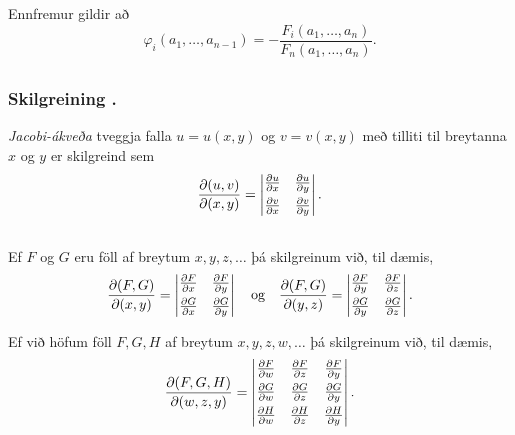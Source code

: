 Ennfremur gildir að 
$$\varphi_i(a_1,\ldots,a_{n-1})
=-\frac{F_i(a_1,\ldots,a_n)}{F_n(a_1,\ldots,a_n)}.$$ 






\subsection{} 

\subsubsection{Skilgreining \kaflanr.}
  
{\em Jacobi-ákveða} tveggja falla $u=u(x,y)$ og $v=v(x,y)$ með
tilliti til breytanna $x$ og $y$ er skilgreind sem 
$$\frac{\partial(u,v)}{\partial(x,y)}=
\begin{vmatrix} 
\frac{\partial u}{\partial x}&\frac{\partial u}{\partial y}\\
\noalign{\smallskip}
\frac{\partial v}{\partial x}&\frac{\partial v}{\partial y}
\end{vmatrix}.$$




\subsection{}

Ef $F$ og $G$ eru föll af breytum $x,y,z,\ldots$ þá skilgreinum við,
til dæmis,
$$\frac{\partial(F,G)}{\partial(x,y)}=
\begin{vmatrix} 
\frac{\partial F}{\partial x}&\frac{\partial F}{\partial y}\\
\noalign{\smallskip}
\frac{\partial G}{\partial x}&\frac{\partial G}{\partial y}
\end{vmatrix}\quad \mbox{og}\quad
\frac{\partial(F,G)}{\partial(y,z)}=
\begin{vmatrix} 
\frac{\partial F}{\partial y}&\frac{\partial F}{\partial z}\\
\noalign{\smallskip}
\frac{\partial G}{\partial y}&\frac{\partial G}{\partial z}
\end{vmatrix}.$$

Ef við höfum föll $F, G, H$ af breytum $x,y,z,w,\ldots$ þá
skilgreinum við, til dæmis,
$$\frac{\partial(F,G,H)}{\partial(w,z,y)}=
\begin{vmatrix} 
\frac{\partial F}{\partial w}&\frac{\partial F}{\partial z}
&\frac{\partial F}{\partial y}\\
\noalign{\smallskip}
\frac{\partial G}{\partial w}&\frac{\partial G}{\partial z}
&\frac{\partial G}{\partial y}\\
\noalign{\smallskip}
\frac{\partial H}{\partial w}&\frac{\partial H}{\partial z}
&\frac{\partial H}{\partial y}
\end{vmatrix}.$$






